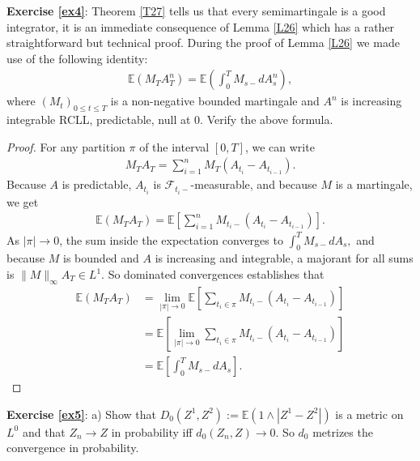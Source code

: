 \documentclass[12pt,a4paper, twoside]{article}
\theoremstyle{definition}
\newcommand{\EE}{\mathbb{E}} %
\begin{document}
\newpage
\noindent \textbf{Exercise \ref{ex4}}: Theorem \ref{T27} tells us that every semimartingale is a good integrator, it is an immediate consequence of Lemma \ref{L26} which has a rather straightforward but technical proof. During the proof of Lemma \ref{L26} we made use of the following identity:
\begin{align*}
\EE(M_TA_T^n) = \EE \left( \int_0^T M_{s-}dA_s^n \right),
\end{align*}
where $(M_t)_{0 \leq t \leq T}$ is a non-negative bounded martingale and $A^n$ is increasing integrable RCLL, predictable, null at $0$. Verify the above formula.
\begin{proof}
For any partition $\pi$ of the interval $[0,T]$, we can write
\begin{align*}
M_TA_T= \sum_{i=1}^n M_T(A_{t_i}-A_{t_{i-1}}).
\end{align*}
Because $A$ is predictable, $A_{t_i}$ is $\mathcal{F}_{t_i-}$-measurable, and because $M$ is a martingale, we get
\begin{align*}
\EE (M_TA_T) = \EE \left[ \sum_{i=1}^n M_{t_i-} (A_{t_i}-A_{t_{i-1}}) \right].
\end{align*}
As $| \pi| \to 0$, the sum inside the expectation converges to $\int_0^T M_{s-}dA_s,$ and because $M$ is bounded and $A$ is increasing and integrable, a majorant for all sums is $\| M\|_\infty A_T \in L^1$. So dominated convergences establishes that
\begin{align*}
\EE(M_TA_T)&= \lim_{| \pi| \to 0} \EE \left[ \sum_{t_i \in \pi} M_{t_i-} (A_{t_i}-A_{t_{i-1}}) \right] \\
&= \EE \left[ \lim_{ | \pi| \to 0} \sum_{t_i \in \pi} M_{t_i-} (A_{t_i}-A_{t_{i-1}}) \right] \\
&= \EE \left[ \int_0^T M_{s-} dA_s \right].
\end{align*}
\end{proof}
\newpage
\noindent \textbf{Exercise \ref{ex5}}: a) Show that $D_0(Z^1,Z^2):= \EE(1 \wedge |Z^1-Z^2|)$ is a metric on $L^0$ and that $Z_n \to Z$ in probability iff $d_0(Z_n,Z) \to 0$. So $d_0$ metrizes the convergence in probability.
\end{document}
